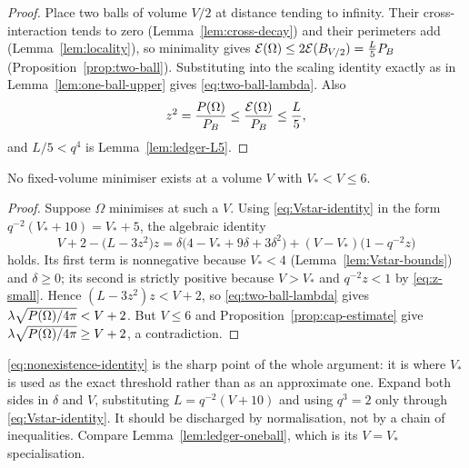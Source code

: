 \begin{proof}
Place two balls of volume $V/2$ at distance tending to infinity.  Their
cross-interaction tends to zero (Lemma~\ref{lem:cross-decay}) and their
perimeters add (Lemma~\ref{lem:locality}), so minimality gives
$\mathcal E(\Omega)\le2\mathcal E(B_{V/2})=\tfrac L5P_B$
(Proposition~\ref{prop:two-ball}).  Substituting into the scaling identity
exactly as in Lemma~\ref{lem:one-ball-upper} gives
\eqref{eq:two-ball-lambda}.  Also
\[
  z^2=\frac{P(\Omega)}{P_B}\le\frac{\mathcal E(\Omega)}{P_B}\le\frac L5 ,
\]
and $L/5<q^4$ is Lemma~\ref{lem:ledger-L5}.
\end{proof}

\begin{proposition}\label{prop:nonexistence-6}
No fixed-volume minimiser exists at a volume $V$ with $V_*<V\le6$.
\end{proposition}

\begin{proof}
Suppose $\Omega$ minimises at such a $V$.  Using
\eqref{eq:Vstar-identity} in the form $q^{-2}(V_*+10)=V_*+5$, the algebraic
identity
\begin{equation}\label{eq:nonexistence-identity}
  V+2-\bigl(L-3z^2\bigr)z
  =\delta\bigl(4-V_*+9\delta+3\delta^2\bigr)
   +(V-V_*)\bigl(1-q^{-2}z\bigr)
\end{equation}
holds.  Its first term is nonnegative because $V_*<4$
(Lemma~\ref{lem:Vstar-bounds}) and $\delta\ge0$; its second is strictly
positive because $V>V_*$ and $q^{-2}z<1$ by \eqref{eq:z-small}.  Hence
$(L-3z^2)z<V+2$, so \eqref{eq:two-ball-lambda} gives
$\lambda\sqrt{P(\Omega)/4\pi}<V+2$.  But
$V\le6$ and Proposition~\ref{prop:cap-estimate} give
$\lambda\sqrt{P(\Omega)/4\pi}\ge V+2$, a contradiction.
\end{proof}

\begin{fnote}
\label{fnote:verify-nonexistence-identity}
\eqref{eq:nonexistence-identity} is the sharp point of the whole argument: it
is where $V_*$ is used as the exact threshold rather than as an approximate
one.  Expand both sides in $\delta$ and $V$, substituting
$L=q^{-2}(V+10)$ and using $q^3=2$ only through
\eqref{eq:Vstar-identity}.  It should be discharged by normalisation, not by a
chain of inequalities.  Compare Lemma~\ref{lem:ledger-oneball}, which is its
$V=V_*$ specialisation.
\end{fnote}

